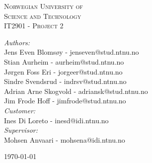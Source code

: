 \begin{center}



\textsc{\LARGE Norwegian University of\\ Science and Technology}\\[1.5cm]

\textsc{\Large IT2901 - Project 2}\\[0.5cm]

\vspace{20 mm}


	\emph{Authors:}\\
	Jens Even Blomsøy 		- 	jenseven@stud.ntnu.no\\
	Stian Aurheim 		- 	aurheim@stud.ntnu.no\\
	Jørgen Foss Eri 		-	jorgeer@stud.ntnu.no\\
	Sindre Svendsrud 		-	indrsv@stud.ntnu.no\\
	Adrian Arne Skogvold 	- 	adriansk@stud.ntnu.no\\
	Jim Frode Hoff 		- 	jimfrode@stud.ntnu.no\\
	\vspace{10 mm}
	\emph{Customer:} \\
	Ines Di Loreto		- 	inesd@idi.ntnu.no\\
	\vspace{10 mm}
	\emph{Supervisor:} \\
	Mohsen Anvaari		-	mohsena@idi.ntnu.no\\

\vfill

{\large \today}

\end{center}
\pagebreak
